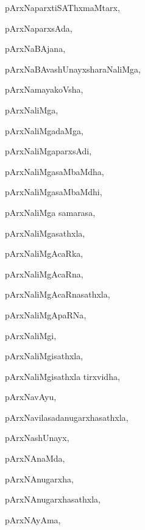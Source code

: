 \begin{multicols}{3}
{\noindent
{pArxNaparxtiSAThxmaMtarx}, \pageref{pArxNaparxtiSAThxmaMtarx}

\noindent
{pArxNaparxsAda}, \pageref{pArxNaparxsAda}

\noindent
{pArxNaBAjana}, \pageref{pArxNaBAjana}

\noindent
{pArxNaBAvashUnayxsharaNaliMga}, \pageref{pArxNaBAvashUnayxsharaNaliMga}

\noindent
{pArxNamayakoVsha}, \pageref{pArxNamayakoVsha}

\noindent
{pArxNaliMga}, \pageref{pArxNaliMga}

\noindent
{pArxNaliMgadaMga}, \pageref{pArxNaliMgadaMga}

\noindent
{pArxNaliMgaparxsAdi}, \pageref{pArxNaliMgaparxsAdi}

\noindent
{pArxNaliMgasaMbaMdha}, \pageref{pArxNaliMgasaMbaMdha}

\noindent
{pArxNaliMgasaMbaMdhi}, \pageref{pArxNaliMgasaMbaMdhi}

\noindent
{pArxNaliMga samarasa}, \pageref{pArxNaliMga samarasa}

\noindent
{pArxNaliMgasathxla}, \pageref{pArxNaliMgasathxla}

\noindent
{pArxNaliMgAcaRka}, \pageref{pArxNaliMgAcaRka}

\noindent
{pArxNaliMgAcaRna}, \pageref{pArxNaliMgAcaRna}

\noindent
{pArxNaliMgAcaRnasathxla}, \pageref{pArxNaliMgAcaRnasathxla}

\noindent
{pArxNaliMgApaRNa}, \pageref{pArxNaliMgApaRNa}

\noindent
{pArxNaliMgi}, \pageref{pArxNaliMgi}

\noindent
{pArxNaliMgisathxla}, \pageref{pArxNaliMgisathxla}

\noindent
{pArxNaliMgisathxla tirxvidha}, \pageref{pArxNaliMgisathxla tirxvidha}

\noindent
{pArxNavAyu}, \pageref{pArxNavAyu}

\noindent
{pArxNavilasadanugarxhasathxla}, \pageref{pArxNavilasadanugarxhasathxla}

\noindent
{pArxNashUnayx}, \pageref{pArxNashUnayx}

\noindent
{pArxNAnaMda}, \pageref{pArxNAnaMda}

\noindent
{pArxNAnugarxha}, \pageref{pArxNAnugarxha}

\noindent
{pArxNAnugarxhasathxla}, \pageref{pArxNAnugarxhasathxla}

\noindent
{pArxNAyAma}, \pageref{pArxNAyAma}

}
\end{multicols}
